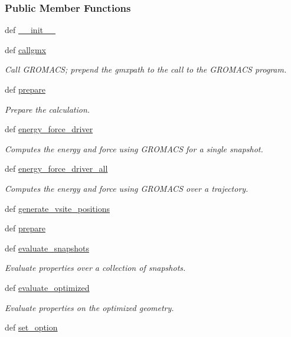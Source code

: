 \subsubsection*{\-Public \-Member \-Functions}
\begin{DoxyCompactItemize}
\item 
def \hyperlink{classforcebalance_1_1gmxio_1_1GMX_a4d5f9e8fb40a37a4c22551d2f30418f4}{\-\_\-\-\_\-init\-\_\-\-\_\-}
\item 
def \hyperlink{classforcebalance_1_1gmxio_1_1GMX_a4e472c27d2c244c9ad6edb5b35f46a75}{callgmx}
\begin{DoxyCompactList}\small\item\em \-Call \-G\-R\-O\-M\-A\-C\-S; prepend the gmxpath to the call to the \-G\-R\-O\-M\-A\-C\-S program. \end{DoxyCompactList}\item 
def \hyperlink{classforcebalance_1_1gmxio_1_1GMX_af2dcb1a6a406a62e38985673bd903463}{prepare}
\begin{DoxyCompactList}\small\item\em \-Prepare the calculation. \end{DoxyCompactList}\item 
def \hyperlink{classforcebalance_1_1gmxio_1_1GMX_a2256beedb26e249848acc34db64f4a74}{energy\-\_\-force\-\_\-driver}
\begin{DoxyCompactList}\small\item\em \-Computes the energy and force using \-G\-R\-O\-M\-A\-C\-S for a single snapshot. \end{DoxyCompactList}\item 
def \hyperlink{classforcebalance_1_1gmxio_1_1GMX_af253e5d8ea66628a0bc755339b488dcb}{energy\-\_\-force\-\_\-driver\-\_\-all}
\begin{DoxyCompactList}\small\item\em \-Computes the energy and force using \-G\-R\-O\-M\-A\-C\-S over a trajectory. \end{DoxyCompactList}\item 
def \hyperlink{classforcebalance_1_1gmxio_1_1GMX_aea0f6d954e7042b70221a55e600f89a5}{generate\-\_\-vsite\-\_\-positions}
\item 
def \hyperlink{classforcebalance_1_1engine_1_1Engine_a2eab57877002b41dc3742f0c67f2f24e}{prepare}
\item 
def \hyperlink{classforcebalance_1_1engine_1_1Engine_aceb1ac74d5f048dfbe620ceac7df8d32}{evaluate\-\_\-snapshots}
\begin{DoxyCompactList}\small\item\em \-Evaluate properties over a collection of snapshots. \end{DoxyCompactList}\item 
def \hyperlink{classforcebalance_1_1engine_1_1Engine_a0e88d58a45ebff5a5d741290e3589ee6}{evaluate\-\_\-optimized}
\begin{DoxyCompactList}\small\item\em \-Evaluate properties on the optimized geometry. \end{DoxyCompactList}\item 
def \hyperlink{classforcebalance_1_1BaseClass_a73e9a37a7632e79eb99f49bd15aced45}{set\-\_\-option}
\end{DoxyCompactItemize}
